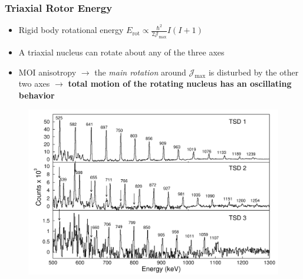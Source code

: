 \documentclass{beamer}
\begin{document}
\begin{frame}
  \frametitle{Triaxial Rotor Energy}
  \begin{itemize}
    \item Rigid body rotational energy $E_\text{rot}\propto\frac{\hbar^2}{2\mathcal{J}_\text{max}}I(I+1 )$
    \item A triaxial nucleus can rotate about any of the three axes
    \item MOI anisotropy $\rightarrow$ the \emph{main rotation} around $\mathcal{J}_\text{max}$ is disturbed by the other two axes  $\rightarrow$ \textbf{total motion of the rotating nucleus has an oscillating behavior}
  \end{itemize}
  \begin{figure}
    \centering
    \includegraphics[scale=0.11]{Figs/collective-spectra.pdf}

\end{figure}
\end{frame}
\end{document}
